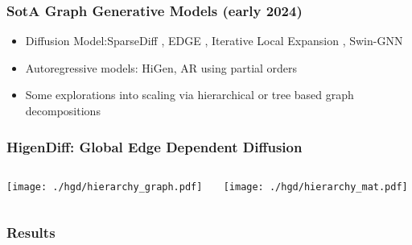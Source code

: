 \documentclass[./presentation.tex]{subfiles}
\begin{document}
\begin{frame}[t,label=hcgd]
  \frametitle{SotA Graph Generative Models (early 2024)}
  \label{frame:sota2023}
  \begin{itemize}
    \item Diffusion Model:SparseDiff \citep{qinSparseTrainingDiscrete2023e}, EDGE \citep{chenEfficientDegreeGuidedGraph2023g}, Iterative Local Expansion \citep{bergmeisterEfficientScalableGraph2024}, Swin-GNN \citep{yanSwinGNNRethinkingPermutation2023b}
    \item Autoregressive models: HiGen\citep{karamiHiGenHierarchicalGraph2023a}, AR using partial orders \citep{zhaoPardPermutationInvariantAutoregressive2024a}
    \item Some explorations into scaling via hierarchical \citep{daviesSizeMattersLarge2023c,lemaireSANGEAScalableAttributed2023} or tree based graph decompositions\citep{shirzadTDGENGraphGeneration2022a}
  \end{itemize}
\end{frame}
\begin{frame}[label=hcgd]
  \frametitle{HigenDiff: Global Edge Dependent Diffusion}
  \begin{columns}
    \begin{column}{0.5\textwidth}
  \texttt{[image: ./hgd/hierarchy\_graph.pdf]}
    \end{column}
    \begin{column}{0.5\textwidth}
   \texttt{[image: ./hgd/hierarchy\_mat.pdf]}
    \end{column}
  \end{columns}
\end{frame}



\begin{frame}[c,label=hcgd]
  \frametitle{Results}
\end{frame}
\end{document}
